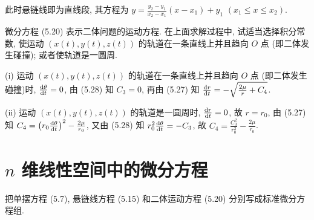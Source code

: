 \begin{solution} 
  此时悬链线即为直线段, 其方程为  $y=\frac{y_2-y_1}{x_2-x_1}(x-x_1)+y_1$ $(x_1\leq x\leq x_2)$.
\end{solution}



\begin{exercise}
  微分方程 (5.20) 表示二体问题的运动方程. 在上面求解过程中, 试适当选择积分常数, 
  使运动 $(x(t),y(t),z(t))$ 的轨道在一条直线上并且趋向 $O$ 点 (即二体发生碰撞); 或者使轨道是一圆周.
\end{exercise}

\begin{solution} 
  (i) 运动 $(x(t),y(t),z(t))$ 的轨道在一条直线上并且趋向 $O$ 点 (即二体发生碰撞)时, 
  $\frac{\mathop{}\!\mathrm{d}\theta}{\mathop{}\!\mathrm{d} t}=0$, 由 (5.28) 知 $C_3=0$, 再由 (5.27) 知
  $\frac{\mathop{}\!\mathrm{d} r}{\mathop{}\!\mathrm{d} t}=-\sqrt{\frac{2\mu}{r}+C_4}$.

  (ii) 运动 $(x(t),y(t),z(t))$ 的轨道是一圆周时, $\frac{\mathop{}\!\mathrm{d} r}{\mathop{}\!\mathrm{d} t}=0$, 
  故 $r=r_0$, 由 (5.27) 知 $C_4=\left(r_0\frac{\mathop{}\!\mathrm{d}\theta}{\mathop{}\!\mathrm{d} t}\right)^2-\frac{2\mu}{r_0}$, 
  又由 (5.28) 知 $r_0^2\frac{\mathop{}\!\mathrm{d}\theta}{\mathop{}\!\mathrm{d} t}=-C_3$, 
  故 $C_4=\frac{C_3^2}{r_0^2}-\frac{2\mu}{r_0}$.
\end{solution}



\section{$n$ 维线性空间中的微分方程}



\begin{exercise}
  把单摆方程 (5.7), 悬链线方程 (5.15) 和二体运动方程 (5.20) 分别写成标准微分方程组.
\end{exercise}

